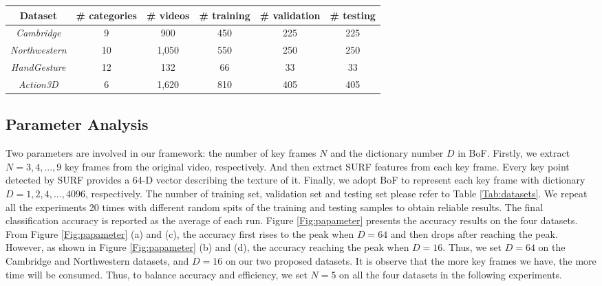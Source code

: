 \documentclass[5p]{elsarticle}
\begin{document}
\begin{table*}[!tbp]
	\centering
	\caption{Characteristics of the datasets used in our hand gesture recognition experiments.}
\begin{tabular}{c|c|c|c|c|c} \hline
		Dataset                        & \# categories & \# videos & \# training  & \# validation & \# testing \\ \hline
		\emph{Cambridge}       & 9             & 900       & 450          & 225            & 225           \\ \hline
		\emph{Northwestern}  & 10            & 1,050      & 550          & 250            & 250         \\ \hline
		\emph{HandGesture}   & 12            & 132       & 66           & 33             & 33               \\ \hline
		\emph{Action3D}         & 6             & 1,620      & 810          & 405            & 405         \\ \hline
	\end{tabular}
	\label{Tab:datasets}
\end{table*}

\subsection{Parameter Analysis}
Two parameters are involved in our framework: the number of key frames $N$ and the dictionary number $D$ in BoF.
Firstly, we extract $N = 3, 4, ..., 9$ key frames from the original video, respectively.
And then extract SURF features from each key frame.
Every key point detected by SURF provides a 64-D vector describing the texture of it.
Finally, we adopt BoF to represent each key frame with dictionary $D = 1, 2, 4, ..., 4096$, respectively.
The number of training set, validation set and testing set please refer to Table \ref{Tab:datasets}.
We repeat all the experiments 20 times with different random spits of the training and testing samples to obtain reliable results.
The final classification accuracy is reported as the average of each run.
Figure \ref{Fig:papameter} presents the accuracy results on the four datasets.
From Figure \ref{Fig:papameter} (a) and (c), the accuracy first rises to the peak when $D = 64$ and then drops after reaching the peak.
However, as shown in Figure \ref{Fig:papameter} (b) and (d), the accuracy reaching the peak when $D = 16$.
Thus, we set $D = 64$ on the Cambridge and Northwestern datasets, and $D = 16$ on our two proposed datasets.
It is observe that the more key frames we have, the more time will be consumed.
Thus, to balance accuracy and efficiency, we set $N = 5$ on all the four datasets in the following experiments.
\end{document}
